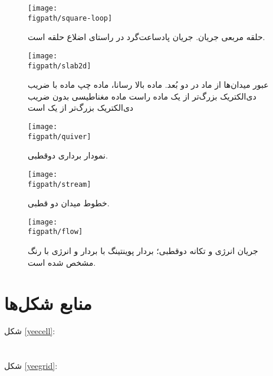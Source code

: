 \documentclass[12pt,a4paper]{article}
\newcommand{\figpath}{../figures}
\newcommand{\figwidth}{0.9\linewidth}
\begin{document}
	\begin{figure}
		\centering
		\texttt{[image: \\figpath/square-loop]}
		\caption{حلقه مربعی جریان. جریان پادساعت‌گرد در راستای اضلاع حلقه است.}
		\texttt{[image: \\figpath/slab2d]}
		\caption{عبور میدان‌ها از ماد در دو بُعد. ماده بالا رسانا، ماده چپ ماده با ضریب دی‌الکتریک بزرگ‌تر از یک 
			ماده راست ماده مغناطیسی بدون ضریب دی‌الکتریک بزرگ‌تر از یک است}
	\end{figure}
	\begin{figure}
		\centering
		\texttt{[image: \\figpath/quiver]}
		\caption{نمودار برداری دوقطبی.}
		\texttt{[image: \\figpath/stream]}
		\caption{خطوط میدان دو قطبی.}
	\end{figure}
	\begin{figure}
		\centering
		\texttt{[image: \\figpath/flow]}
		\caption{جریان انرژی و تکانه دوقطبی؛ بردار پوینتینگ با بردار و انرژی با رنگ مشخص شده است.}
	\end{figure}
	\FloatBarrier
	\setLTRbibitems
	
	
	\section*{منابع شکل‌ها}
	شکل \ref{yeecell}: \\
	 \\ \\
	شکل \ref{yeegrid}: \\
\end{document}
